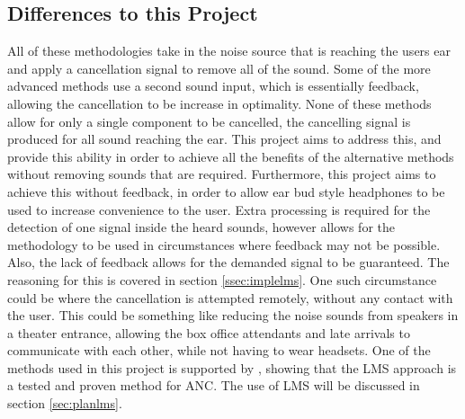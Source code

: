 \subsection{Differences to this Project}
All of these methodologies take in the noise source that is reaching the users ear and apply a cancellation signal to remove all of the sound.
Some of the more advanced methods use a second sound input, which is essentially feedback, allowing the cancellation to be increase in optimality.
None of these methods allow for only a single component to be cancelled, the cancelling signal is produced for all sound reaching the ear.
This project aims to address this, and provide this ability in order to achieve all the benefits of the alternative methods without removing sounds that are required.
Furthermore, this project aims to achieve this without feedback, in order to allow ear bud style headphones to be used to increase convenience to the user.
Extra processing is required for the detection of one signal inside the heard sounds, however allows for the methodology to be used in circumstances where feedback may not be possible.
Also, the lack of feedback allows for the demanded signal to be guaranteed.
The reasoning for this is covered in section \ref{ssec:implelms}.
One such circumstance could be where the cancellation is attempted remotely, without any contact with the user.
This could be something like reducing the noise sounds from speakers in a theater entrance, allowing the box office attendants and late arrivals to communicate with each other, while not having to wear headsets.
One of the methods used in this project is supported by \cite{EMHeadsets,EMNoiseCancel,2SensorANCAlg}, showing that the LMS approach is a tested and proven method for ANC.
The use of LMS will be discussed in section \ref{sec:planlms}.
